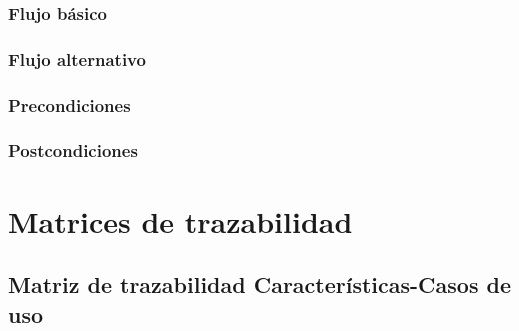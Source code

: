 \documentclass[12pt, a4paper, titlepage]{article}
\begin{document}
\subsubsection{Flujo básico}
\subsubsection{Flujo alternativo}
\subsubsection{Precondiciones}
\subsubsection{Postcondiciones}

\section{Matrices de trazabilidad}  
\subsection{\large Matriz de trazabilidad Características-Casos de uso}

  
\end{document}

